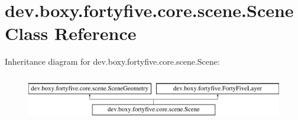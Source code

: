 \hypertarget{classdev_1_1boxy_1_1fortyfive_1_1core_1_1scene_1_1_scene}{
\section{dev.boxy.fortyfive.core.scene.Scene Class Reference}
\label{d6/d2d/classdev_1_1boxy_1_1fortyfive_1_1core_1_1scene_1_1_scene}
}
Inheritance diagram for dev.boxy.fortyfive.core.scene.Scene:\begin{figure}[H]
\begin{center}
\leavevmode
\includegraphics[height=1.964912cm]{d6/d2d/classdev_1_1boxy_1_1fortyfive_1_1core_1_1scene_1_1_scene}
\end{center}
\end{figure}
